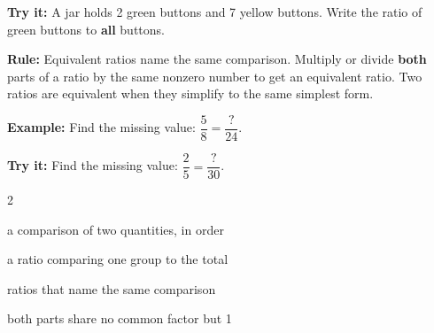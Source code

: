\documentclass[12pt]{article}
\begin{document}
\begin{tryitbox}
\textbf{Try it:} \quad A jar holds 2 green buttons and 7 yellow buttons. Write
the ratio of green buttons to \textbf{all} buttons.\\[2pt]
\end{tryitbox}


\begin{formulabox}
\textbf{Rule:} Equivalent ratios name the same comparison. Multiply or divide
\textbf{both} parts of a ratio by the same nonzero number to get an equivalent
ratio. Two ratios are equivalent when they simplify to the same simplest form.
\end{formulabox}

\begin{examplebox}
\textbf{Example:} \quad Find the missing value: $\dfrac{5}{8} = \dfrac{?}{24}$.
\end{examplebox}

\begin{tryitbox}
\textbf{Try it:} \quad Find the missing value: $\dfrac{2}{5} = \dfrac{?}{30}$.\\[2pt]
\end{tryitbox}

\vspace{0.3cm}

\begin{multicols}{2}
\begin{description}[leftmargin=0.5cm, itemsep=2pt, font=\normalfont\bfseries]
  \item[Ratio:] a comparison of two quantities, in order
  \item[Part-to-whole:] a ratio comparing one group to the total
  \item[Equivalent ratios:] ratios that name the same comparison
  \item[Simplest form:] both parts share no common factor but 1
\end{description}
\end{multicols}
\end{document}

